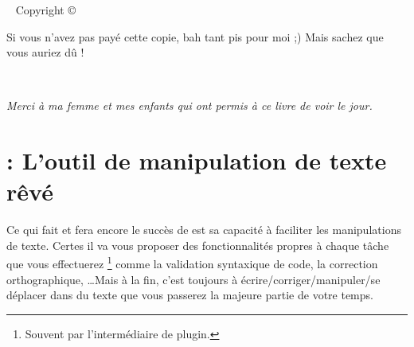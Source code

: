



\frontmatter

\blankpage

\maketitle


\newpage
\begin{fullwidth}
~\vfill
\thispagestyle{empty}
\setlength{\parindent}{0pt}
\setlength{\parskip}{\baselineskip}
Copyright \copyright\ \the\year\ \thanklessauthor

\par{}

\par{}

\par Si vous n'avez pas payé cette copie, bah tant pis pour moi ;) Mais sachez que vous auriez dû !

\end{fullwidth}

\tableofcontents

\listoffigures

\listoftables

\cleardoublepage
~\vfill
\begin{doublespace}
\noindent\fontsize{18}{22}\selectfont\itshape
\nohyphenation
Merci à ma femme et mes enfants qui ont permis à ce livre de voir le jour.
\end{doublespace}
\vfill
\vfill

\cleardoublepage



\mainmatter




\chapter{\vim : L'outil de manipulation de texte rêvé}

Ce qui fait et fera encore le succès de \vim est sa capacité à faciliter les manipulations de texte. Certes il va vous proposer des fonctionnalités propres à chaque tâche que vous effectuerez \footnote{Souvent par l'intermédiaire de plugin.} comme la validation syntaxique de code, la correction orthographique, \ldots Mais à la fin, c'est toujours à écrire/corriger/manipuler/se déplacer dans du texte que vous passerez la majeure partie de votre temps. 

